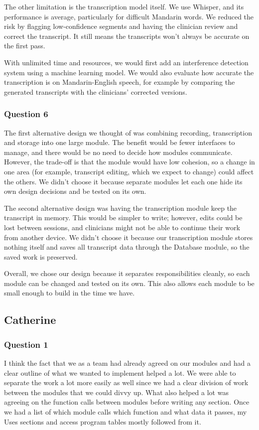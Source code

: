 \documentclass[12pt, titlepage]{article}
\begin{document}
\begin{enumerate}
The other limitation is the transcription model itself. We use Whisper, and its performance is average, particularly for difficult Mandarin words. 
We reduced the risk by flagging low-confidence segments and having the clinician review and correct the transcript. 
It still means the transcripts won’t always be accurate on the first pass. 

With unlimited time and resources, we would first add an interference detection system using a machine learning model. 
We would also evaluate how accurate the transcription is on Mandarin-English speech, for example by comparing the generated transcripts with the clinicians’ corrected versions.

\subsubsection*{Question 6}  
The first alternative design we thought of was combining recording, transcription and storage into one large module. 
The benefit would be fewer interfaces to manage, and there would be no need to decide how modules communicate. 
However, the trade-off is that the module would have low cohesion, so a change in one area (for example, transcript editing, which we expect to change) could affect the others. 
We didn’t choose it because separate modules let each one hide its own design decisions and be tested on its own.

The second alternative design was having the transcription module keep the transcript in memory. 
This would be simpler to write; however, edits could be lost between sessions, and clinicians might not be able to continue their work from another device. 
We didn’t choose it because our transcription module stores nothing itself and saves all transcript data through the Database module, so the saved work is preserved. 

Overall, we chose our design because it separates responsibilities cleanly, so each module can be changed and tested on its own. This also allows each module to be small enough to build in the time we have.

\subsection*{Catherine}
\subsubsection*{Question 1}
I think the fact that we as a team had already agreed on our modules and had a clear
outline of what we wanted to implement helped a lot. We were able to separate the 
work a lot more easily as well since we had a clear division of work between the
modules that we could divvy up. 
What also helped a lot was agreeing on the function calls between modules before writing any section. 
Once we had a list of which module calls which function and what data it passes, 
my Uses sections and access program tables mostly followed from it.


\end{enumerate}
\end{document}
